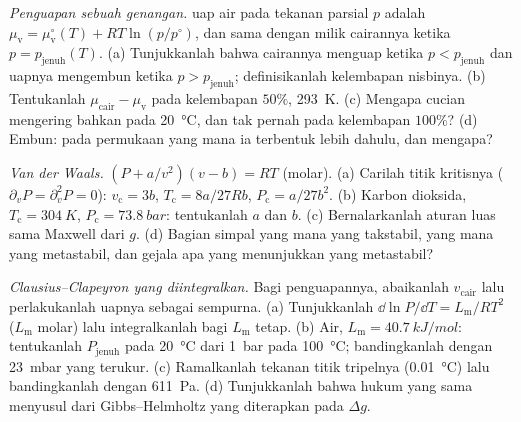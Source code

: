\begin{exercise}[$\star\star$]\label{exo:b2:thermodynamic-potentials:8}
\emph{Penguapan sebuah genangan.}  uap air
pada tekanan parsial $p$ adalah $\mu_{\text{v}} = \mu_{\text{v}}^\circ(T) +
RT\ln(p/p^\circ)$, dan sama dengan milik cairannya ketika $p = p_{\text{jenuh}}(T)$.
(a) Tunjukkanlah bahwa cairannya menguap ketika $p < p_{\text{jenuh}}$ dan uapnya
mengembun ketika $p > p_{\text{jenuh}}$; definisikanlah kelembapan nisbinya. (b)
Tentukanlah $\mu_{\text{cair}} - \mu_{\text{v}}$ pada kelembapan $50\%$, \qty{293}{K}. (c) Mengapa
cucian mengering bahkan pada \qty{20}{\celsius}, dan tak pernah pada kelembapan $100\%$?
(d) Embun: pada permukaan yang mana ia terbentuk lebih dahulu, dan mengapa?
\end{exercise}

\begin{exercise}[$\star\star$]\label{exo:b2:thermodynamic-potentials:9}
\emph{Van der Waals.} $(P + a/v^2)(v - b) = RT$ (molar). (a) Carilah
titik kritisnya ($\partial_vP = \partial_v^2P = 0$): $v_{\text{c}} = 3b$,
$T_{\text{c}} = 8a/27Rb$, $P_{\text{c}} = a/27b^2$. (b) Karbon dioksida,
$T_{\text{c}} = \qty{304}{K}$, $P_{\text{c}} = \qty{73.8}{bar}$: tentukanlah $a$ dan $b$. (c)
Bernalarkanlah aturan luas sama Maxwell dari $g$. (d) Bagian simpal yang mana
yang takstabil, yang mana yang metastabil, dan gejala apa yang menunjukkan yang
metastabil?
\end{exercise}

\begin{exercise}[$\star\star\star$]\label{exo:b2:thermodynamic-potentials:10}
\emph{Clausius--Clapeyron yang diintegralkan.} Bagi penguapannya, abaikanlah $v_{\text{cair}}$
lalu perlakukanlah uapnya sebagai sempurna. (a) Tunjukkanlah $\dd\ln P/\dd T = L_{\text{m}}/RT^2$
($L_{\text{m}}$ molar) lalu integralkanlah bagi $L_{\text{m}}$ tetap. (b) Air,
$L_{\text{m}} = \qty{40.7}{kJ/mol}$: tentukanlah $P_{\text{jenuh}}$ pada \qty{20}{\celsius} dari
\qty{1}{bar} pada \qty{100}{\celsius}; bandingkanlah dengan \qty{23}{mbar} yang terukur.
(c) Ramalkanlah tekanan titik tripelnya (\qty{0.01}{\celsius}) lalu bandingkanlah
dengan \qty{611}{Pa}. (d) Tunjukkanlah bahwa hukum yang sama menyusul dari Gibbs--Helmholtz
yang diterapkan pada $\Delta g$.
\end{exercise}

